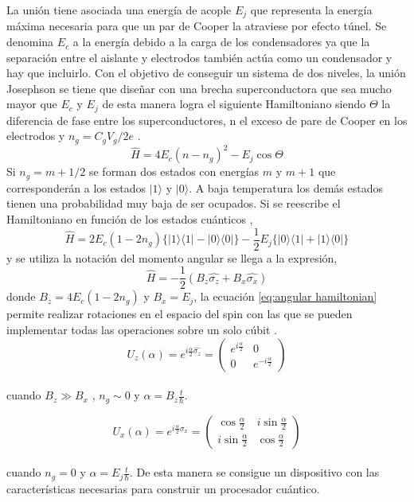 La unión tiene asociada una energía de acople $E_j$ que representa la energía máxima necesaria para que un par de Cooper la atraviese por efecto túnel. Se denomina $E_c$ a la energía debido a la carga de los condensadores ya que la separación entre el aislante y electrodos también actúa como un condensador y hay que incluirlo. Con el objetivo de conseguir un sistema de dos niveles, la unión Josephson se tiene que diseñar con una brecha superconductora que sea mucho mayor que $E_c$ y $E_j$ de esta manera logra el siguiente Hamiltoniano siendo $\Theta$ la diferencia de fase entre los superconductores, n el exceso de pare de Cooper en los electrodos y $n_g = C_gV_g/2e$ \citep{leonardo_qubits_2004}.
\begin{equation} \label{eq:hamiltonian}
  \widehat{H} = 4E_c(n-n_g)^2 - E_j\cos\Theta
\end{equation}
Si $n_g = m+1/2$ se forman dos estados con energías $m$ y $m + 1$ que corresponderán a los estados $|1\rangle$ y $|0\rangle$. A baja temperatura los demás estados tienen una probabilidad muy baja de ser ocupados.
Si se reescribe el Hamiltoniano en función de los estados cuánticos \citep{gu_microwave_2017} ,
\begin{equation} \label{eq:ket hamiltonian}
  \widehat{H}  = 2E_c(1-2n_g)\{|1\rangle\langle1| - |0\rangle\langle0|\} - \frac{1}{2}E_j\{|0\rangle\langle1| + |1\rangle\langle0|\}
\end{equation}
 y se utiliza la notación del momento angular se llega a la expresión,
 \begin{equation} \label{eq:angular hamiltonian}
  \widehat{H}  = - \frac{1}{2}(B_z\hat{\sigma_z}  + B_x\hat{\sigma_x})
\end{equation}
donde $B_z = 4E_c(1-2n_g)$ y $B_x=E_j$, la ecuación \ref*{eq:angular hamiltonian} permite realizar rotaciones en el espacio del spin con las que se pueden implementar todas las operaciones sobre un solo cúbit \citep{leonardo_qubits_2004}. 
\begin{equation}\label{eq:1 rotation}
  U_z(\alpha )= e^{i\frac{\alpha }{2}\hat{\sigma_z}} = 
  \begin{pmatrix}
    e^{i\frac{\alpha}{2}} & 0 \\
    0 & e^{-i\frac{\alpha}{2}}
  \end{pmatrix}
\end{equation}\\
cuando $B_z \gg B_x$ ,  $n_g\sim 0$ y $\alpha = B_z \frac{t}{\hbar}$.

\begin{equation}\label{eq:2 rotation}
  U_x(\alpha )= e^{i\frac{\alpha }{2}\hat{\sigma_x}} = 
  \begin{pmatrix}
    \cos \frac{\alpha}{2}  & i\sin \frac{\alpha}{2} \\
    i\sin \frac{\alpha}{2} & \cos \frac{\alpha}{2}
  \end{pmatrix}
\end{equation}\\
cuando $n_g = 0$ y $\alpha = E_j \frac{t}{\hbar}$.
De esta manera se consigue un dispositivo con las características necesarias para construir un procesador cuántico.